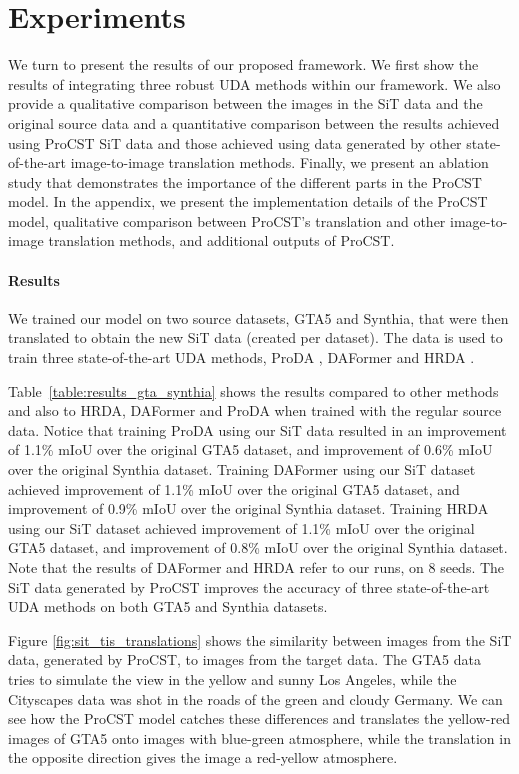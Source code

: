 \documentclass[letterpaper]{article} \usepackage[]{aaai23}  \usepackage{times}  \usepackage{helvet}  \usepackage{courier}  \usepackage[hyphens]{url}  \usepackage{graphicx} \urlstyle{rm} \def\UrlFont{\rm}  \usepackage{natbib}  \usepackage{caption} \frenchspacing  \setlength{\pdfpagewidth}{8.5in} \setlength{\pdfpageheight}{11in} \usepackage{algorithm}
\begin{document}
\section{Experiments}
\label{sec:experiment}
We turn to present the results of our proposed framework. We first show the results of integrating three robust UDA methods within our framework. We also provide a qualitative comparison between the images in the SiT data and the original source data and a quantitative comparison between the results achieved using ProCST SiT data and those achieved using data generated by other state-of-the-art image-to-image translation methods. Finally, we present an ablation study that demonstrates the importance of the different parts in the ProCST model. In the appendix, we present the implementation details of the ProCST model, qualitative comparison between ProCST's translation and other image-to-image translation methods, and additional outputs of ProCST.

\paragraph{Results}
We trained our model on two source datasets, GTA5 and Synthia, that were then translated to obtain the new SiT data (created per dataset). The data is used to train three state-of-the-art UDA methods, ProDA \cite{zhang2021prototypical}, DAFormer \cite{hoyer2021daformer} and HRDA \cite{hoyer2022hrda}. 

Table~\ref{table:results_gta_synthia} shows the results compared to other methods and also to HRDA, DAFormer and ProDA when trained with the regular source data.
Notice that training ProDA using our SiT data resulted in an improvement of 1.1\% mIoU over the original GTA5 dataset, and improvement of 0.6\% mIoU over the original Synthia dataset. Training DAFormer using our SiT dataset achieved improvement of 1.1\% mIoU over the original GTA5 dataset, and improvement of 0.9\% mIoU over the original Synthia dataset. Training HRDA using our SiT dataset achieved improvement of 1.1\% mIoU over the original GTA5 dataset, and improvement of 0.8\% mIoU over the original Synthia dataset. Note that the results of DAFormer and HRDA refer to our runs, on 8 seeds. The SiT data generated by ProCST improves the accuracy of three state-of-the-art UDA methods on both GTA5 and Synthia datasets.

Figure \ref{fig:sit_tis_translations} shows the similarity between images from the SiT data, generated by ProCST, to images from the target data. The GTA5 data tries to simulate the view in the yellow and sunny Los Angeles, while the Cityscapes data was shot in the roads of the green and cloudy Germany. We can see how the ProCST model catches these differences and translates the yellow-red images of GTA5 onto images with blue-green atmosphere, while the translation in the opposite direction gives the image a red-yellow atmosphere.
\end{document}
